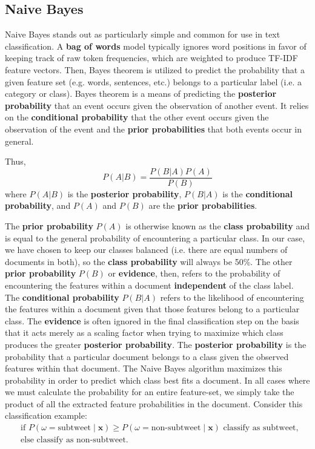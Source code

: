 \documentclass[11pt, twoside, reqno]{book}
\begin{document}
\subsection{Naive Bayes}
\label{naive_bayes}

Naive Bayes stands out as particularly simple and common for use in text classification. A \textbf{bag of words} model typically ignores word positions in favor of keeping track of raw token frequencies, which are weighted to produce TF-IDF feature vectors. Then, Bayes theorem is utilized to predict the probability that a given feature set (e.g. words, sentences, etc.) belongs to a particular label (i.e. a category or class). Bayes theorem is a means of predicting the \textbf{posterior probability} that an event occurs given the observation of another event. It relies on the \textbf{conditional probability} that the other event occurs given the observation of the event and the \textbf{prior probabilities} that both events occur in general.

\noindent
Thus,
\[{P(A|B)}=\frac{P(B|A)P(A)}{P(B)}\]
where $P(A|B)$ is the \textbf{posterior probability}, $P(B|A)$ is the \textbf{conditional probability}, and $P(A)$ and $P(B)$ are the \textbf{prior probabilities}.

The \textbf{prior probability} $P(A)$ is otherwise known as the \textbf{class probability} and is equal to the general probability of encountering a particular class. In our case, we have chosen to keep our classes balanced (i.e. there are equal numbers of documents in both), so the \textbf{class probability} will always be 50\%. The other \textbf{prior probability} $P(B)$ or \textbf{evidence}, then, refers to the probability of encountering the features within a document \textbf{independent} of the class label. The \textbf{conditional probability} $P(B|A)$ refers to the likelihood of encountering the features within a document given that those features belong to a particular class. The \textbf{evidence} is often ignored in the final classification step on the basis that it acts merely as a scaling factor when trying to maximize which class produces the greater \textbf{posterior probability}. The \textbf{posterior probability} is the probability that a particular document belongs to a class given the observed features within that document. The Naive Bayes algorithm maximizes this probability in order to predict which class best fits a document. In all cases where we must calculate the probability for an entire feature-set, we simply take the product of all the extracted feature probabilities in the document. Consider this classification example:
\[
\begin{split}
	& \text{if } P(  \omega = \text{subtweet} \mid \textbf{x}) \ge P(\omega = \text{non-subtweet} \mid \textbf{x})  \text{ classify as subtweet, }\\
	&  \text{else classify as non-subtweet. }
\end{split}
\]
\end{document}
